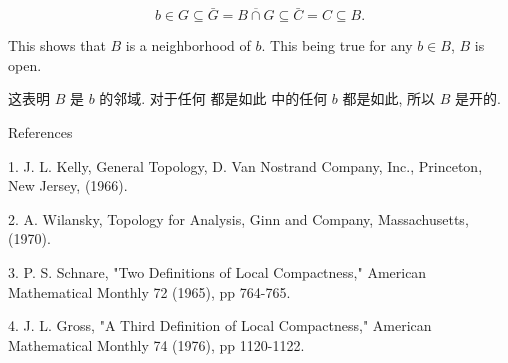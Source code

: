 \documentclass[options]{article}
\begin{document}
\[
		b \in G \subseteq \bar{G}=\overline{B \cap G} \subseteq \bar{C}=C \subseteq B .
\]
\begin{paracol}{2}

	\begin{en}
		This shows that $B$ is a neighborhood of $b$. This being true for any
		$b \in B$, $B$ is open.
	\end{en}
	\begin{cn}
		这表明 $B$ 是 $b$ 的邻域. 对于任何
		都是如此 中的任何 $b$ 都是如此, 所以 $B$ 是开的.
	\end{cn}
\end{paracol}

References

1. J. L. Kelly, General Topology, D. Van Nostrand Company, Inc., Princeton,
New Jersey, (1966).

2. A. Wilansky, Topology for Analysis, Ginn and Company,
Massachusetts, (1970).

3. P. S. Schnare, "Two Definitions of Local Compactness," American
Mathematical Monthly 72 (1965), pp 764-765.

4. J. L. Gross, "A Third Definition of Local
Compactness," American Mathematical Monthly 74 (1976), pp 1120-1122.
\end{document}
